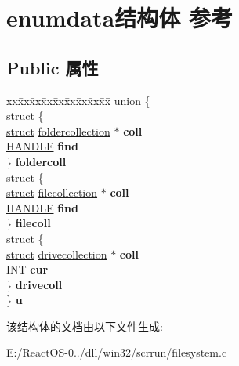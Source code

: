 \hypertarget{structenumdata}{}\section{enumdata结构体 参考}
\label{structenumdata}
\subsection*{Public 属性}
\begin{DoxyCompactItemize}
\item 
\mbox{\label{structenumdata_a52d897a3b1175f825563df1d7b3c53b3}} 
\begin{tabbing}
xx\=xx\=xx\=xx\=xx\=xx\=xx\=xx\=xx\=\kill
union \{\\
\>struct \{\\
\>\>\hyperlink{interfacestruct}{struct} \hyperlink{structfoldercollection}{foldercollection} $\ast$ {\bfseries coll}\\
\>\>\hyperlink{interfacevoid}{HANDLE} {\bfseries find}\\
\>\} {\bfseries foldercoll}\\
\>struct \{\\
\>\>\hyperlink{interfacestruct}{struct} \hyperlink{structfilecollection}{filecollection} $\ast$ {\bfseries coll}\\
\>\>\hyperlink{interfacevoid}{HANDLE} {\bfseries find}\\
\>\} {\bfseries filecoll}\\
\>struct \{\\
\>\>\hyperlink{interfacestruct}{struct} \hyperlink{structdrivecollection}{drivecollection} $\ast$ {\bfseries coll}\\
\>\>INT {\bfseries cur}\\
\>\} {\bfseries drivecoll}\\
\} {\bfseries u}\\

\end{tabbing}\end{DoxyCompactItemize}


该结构体的文档由以下文件生成\+:\begin{DoxyCompactItemize}
\item 
E\+:/\+React\+O\+S-\/0../dll/win32/scrrun/filesystem.\+c\end{DoxyCompactItemize}
